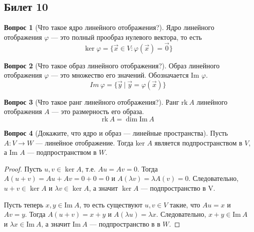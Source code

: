 \documentclass[a4paper,11pt]{article}
\theoremstyle{remark}
\theoremstyle{definition}
\newtheorem{question}{Вопрос}
\numberwithin{question}{subsection}
\begin{document}
\subsection{Билет 10}
\begin{question}[Что такое ядро линейного отображения?]
Ядро линейного отображения \(\varphi\) --- это полный прообраз нулевого вектора, то есть 
\begin{equation*}
	\ker \varphi = \{\vec{x} \in V\!: \varphi(\vec{x}) = \vec{0}\}
\end{equation*}
\end{question}


\begin{question}[Что такое образ линейного отображения?]
Образ линейного отображения \(\varphi\) --- это множество его значений. Обозначается Im \(\varphi\).
\begin{equation*}
	Im \ \varphi = \{\vec{y} \ |\  \vec{y} = \varphi(\vec{x})\}
\end{equation*}
\end{question}


\begin{question}[Что такое ранг линейного отображения?]
Ранг \(\mathrm{rk}\:A\) линейного отображения \(A\) --- это размерность его образа.
\begin{equation*}
	\mathrm{rk}\:A = \dim \mathrm{Im}\:A
\end{equation*}
\end{question}


\begin{question}[Докажите, что ядро и образ --- линейные пространства]
Пусть \(A: V \rightarrow W\) --- линейное отображение. Тогда ker \(A\) является подпространством в \(V\), а Im \(A\) --- подпространством в \(W\).
\begin{proof}
Пусть \(u, v \in \ker A\), т.е. \(Au = Av = 0\). Тогда \(A(u + v) = Au + Av = 0 + 0 = 0\) и \(A(\lambda{}v) = \lambda{}A(v) = 0\). Следовательно, \(u + v \in \ker A\) и \(\lambda{}v \in \ker A\), а значит \(\ker A\) --- подпространство в V.

Пусть теперь \(x, y \in \mathrm{Im}\:A\), то есть существуют \(u, v \in V\) такие, что \(Au = x\) и \(Av = y\). Тогда \(A(u + v) = x + y\) и \(A(\lambda{}u) = \lambda{}x\). Следовательно, \(x + y \in \mathrm{Im}\:A\) и \(\lambda{}x \in \mathrm{Im}\:A\), а значит \(\mathrm{Im}\:A\) --- подпространство в в \(W\).
\end{proof}
\end{question}
\end{document}
